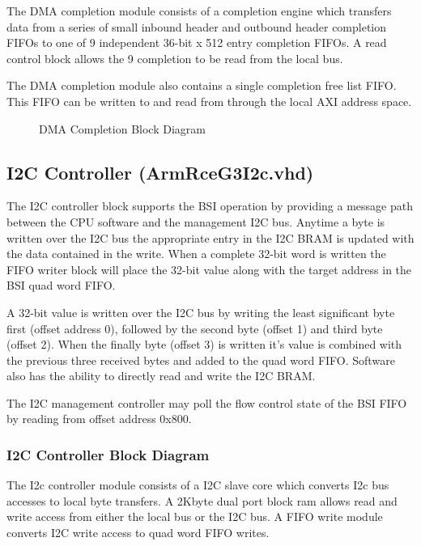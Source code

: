 \documentclass[11pt]{article}
\begin{document}
The DMA completion module consists of a completion engine which transfers data from a series of small inbound header and outbound header 
completion FIFOs to one of 9 independent 36-bit x 512 entry completion FIFOs. A read control block allows the 9 completion to be read from
the local bus.

The DMA completion module also contains a single completion free list FIFO. This FIFO can be written to and read from through the local AXI address space. 

\begin{figure}[H]
   \centering
   \caption{DMA Completion Block Diagram}
   \label{fig:dma_comp_block}
\end{figure}

\subsection{I2C Controller (ArmRceG3I2c.vhd)}
\label{subsec:ArmRceG3I2c}

The I2C controller block supports the BSI operation by providing a message path between the CPU software and the management I2C bus. Anytime a 
byte is written over the I2C bus the appropriate entry in the I2C BRAM is updated with the data contained in the write. When a complete 32-bit
word is written the FIFO writer block will place the 32-bit value along with the target address in the BSI quad word FIFO. 

A 32-bit value is written over the I2C bus by writing the least significant byte first (offset address 0), followed by the second byte (offset 1)
and third byte (offset 2). When the finally byte (offset 3) is written it's value is combined with the previous three received bytes and added to
the quad word FIFO. Software also has the ability to directly read and write the I2C BRAM. 

The I2C management controller may poll the flow control state of the BSI FIFO by reading from offset address 0x800.

\subsubsection{I2C Controller Block Diagram}

The I2c controller module consists of a I2C slave core which converts I2c bus accesses to local byte transfers. A 2Kbyte dual port block ram 
allows read and write access from either the local bus or the I2C bus. A FIFO write module converts I2C write access to quad word FIFO writes.
\end{document}
